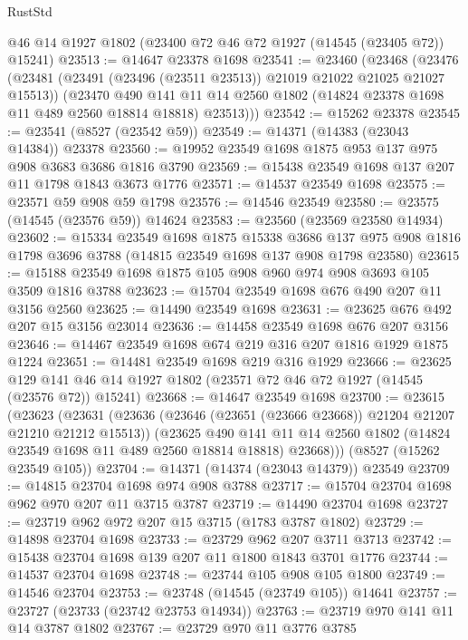 \begin{lexlean}{RustStd}
\begin{coremodule}
    @46
    @14
    @1927
    @1802
    (@23400 @72 @46 @72 @1927 (@14545 (@23405 @72)) @15241)
@23513 := @14647 @23378 @1698
@23541 := @23460
    (@23468
      (@23476
        (@23481 (@23491 (@23496 (@23511 @23513)) @21019 @21022 @21025 @21027 @15513))
        (@23470
          @490
          @141
          @11
          @14
          @2560
          @1802
          (@14824 @23378 @1698 @11 @489 @2560 @18814 @18818)
          @23513)))
@23542 := @15262 @23378
@23545 := @23541 (@8527 (@23542 @59))
@23549 := @14371 (@14383 (@23043 @14384)) @23378
@23560 := @19952 @23549 @1698 @1875 @953 @137 @975 @908 @3683 @3686 @1816 @3790
@23569 := @15438 @23549 @1698 @137 @207 @11 @1798 @1843 @3673 @1776
@23571 := @14537 @23549 @1698
@23575 := @23571 @59 @908 @59 @1798
@23576 := @14546 @23549
@23580 := @23575 (@14545 (@23576 @59)) @14624
@23583 := @23560 (@23569 @23580 @14934)
@23602 := @15334
    @23549
    @1698
    @1875
    @15338
    @3686
    @137
    @975
    @908
    @1816
    @1798
    @3696
    @3788
    (@14815 @23549 @1698 @137 @908 @1798 @23580)
@23615 := @15188 @23549 @1698 @1875 @105 @908 @960 @974 @908 @3693 @105 @3509 @1816 @3788
@23623 := @15704 @23549 @1698 @676 @490 @207 @11 @3156 @2560
@23625 := @14490 @23549 @1698
@23631 := @23625 @676 @492 @207 @15 @3156 @23014
@23636 := @14458 @23549 @1698 @676 @207 @3156
@23646 := @14467 @23549 @1698 @674 @219 @316 @207 @1816 @1929 @1875 @1224
@23651 := @14481 @23549 @1698 @219 @316 @1929
@23666 := @23625
    @129
    @141
    @46
    @14
    @1927
    @1802
    (@23571 @72 @46 @72 @1927 (@14545 (@23576 @72)) @15241)
@23668 := @14647 @23549 @1698
@23700 := @23615
    (@23623
      (@23631
        (@23636 (@23646 (@23651 (@23666 @23668)) @21204 @21207 @21210 @21212 @15513))
        (@23625
          @490
          @141
          @11
          @14
          @2560
          @1802
          (@14824 @23549 @1698 @11 @489 @2560 @18814 @18818)
          @23668)))
    (@8527 (@15262 @23549 @105))
@23704 := @14371 (@14374 (@23043 @14379)) @23549
@23709 := @14815 @23704 @1698 @974 @908 @3788
@23717 := @15704 @23704 @1698 @962 @970 @207 @11 @3715 @3787
@23719 := @14490 @23704 @1698
@23727 := @23719 @962 @972 @207 @15 @3715 (@1783 @3787 @1802)
@23729 := @14898 @23704 @1698
@23733 := @23729 @962 @207 @3711 @3713
@23742 := @15438 @23704 @1698 @139 @207 @11 @1800 @1843 @3701 @1776
@23744 := @14537 @23704 @1698
@23748 := @23744 @105 @908 @105 @1800
@23749 := @14546 @23704
@23753 := @23748 (@14545 (@23749 @105)) @14641
@23757 := @23727 (@23733 (@23742 @23753 @14934))
@23763 := @23719 @970 @141 @11 @14 @3787 @1802
@23767 := @23729 @970 @11 @3776 @3785

\end{coremodule}
\end{lexlean}
